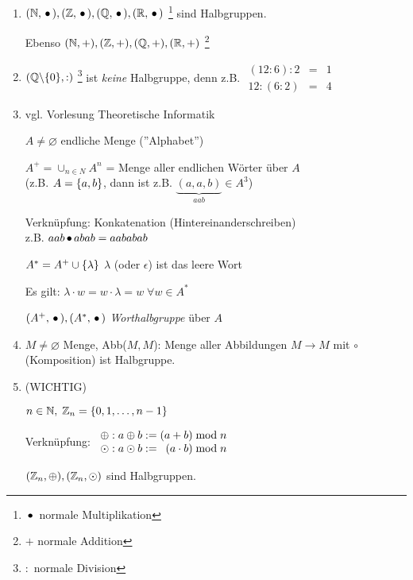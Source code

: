 \begin{enumerate}
	
	\item
	$(\mathbb{N}, \,{\bullet}\,), (\mathbb{Z}, \,{\bullet}\,), (\mathbb{Q}, \,{\bullet}\,), (\mathbb{R}, \,{\bullet}\,)$ \footnote{$\,{\bullet}\,$ normale Multiplikation}
	sind Halbgruppen.
	
	Ebenso $(\mathbb{N}, +), (\mathbb{Z}, +), (\mathbb{Q}, +), (\mathbb{R}, +)$ \footnote{$+$ normale Addition} 
	
	
	\item
	$(\mathbb{Q} \backslash \{0\}, :)$ \footnote{$:$ normale Division} ist \emph{keine} Halbgruppe, denn z.B.
	$\begin{array}{ccc}
	(12 : 6) : 2	&=& 1 \\
	12 : (6 : 2)	&=& 4
	\end{array}$
	
	\item
	vgl. Vorlesung Theoretische Informatik
	
	$A \neq \varnothing$ endliche Menge (''Alphabet'')
	
	$A^+ = \cup_{n \in N} A^n$ = Menge aller endlichen Wörter über $A$
	\\(z.B. $A=\left\{a, b\right\}$, dann ist z.B. $\underset{aab}{\underbrace{(a, a, b)}} \in A^3$)
	
	Verknüpfung: Konkatenation (Hintereinanderschreiben)
	\\z.B. $aab \,{\bullet}\, abab = aababab$
	
	$A^* = A^+ \cup \left\{\lambda\right\}$ 
	\quad$\lambda$ (oder $\epsilon$) ist das leere Wort 
	
	Es gilt: 
	$\lambda \cdot w = w \cdot \lambda = w \;\forall w \in A^*$
	
	$(A^+, \,{\bullet}\,), (A^*, \,{\bullet}\,)$ \emph{Worthalbgruppe} über $A$
	
	
	\item
	$M \neq \varnothing$ Menge, Abb($M,M$): Menge aller Abbildungen $M \to M$
	mit $\circ$ (Komposition) ist Halbgruppe.
	
	\item (WICHTIG)
	
	$n \in \mathbb{N},\; \mathbb{Z}_n = \left\{0, 1, \dots, n-1\right\}$
	
	Verknüpfung:
	$\begin{array}{c@{\;:\;}r@{\;:=\;}r}
		\oplus	& a \oplus b	& (a+b) \mod{n} \\
		\odot	& a \odot b		& (a\cdot b)\mod{n}
	\end{array}$
	
	$(\mathbb{Z}_n, \oplus), (\mathbb{Z}_n, \odot)$ sind Halbgruppen.
	
\end{enumerate}
